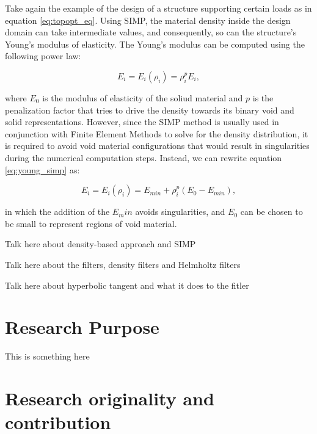 \documentclass[../main.tex]{subfiles}
\begin{document}
Take again the example of the design of a structure supporting certain loads as in equation \ref{eq:topopt_eq}. Using SIMP, the material density inside the design domain can take intermediate values, and consequently, so can the structure's Young's modulus of elasticity. The Young's modulus can be computed using the following power law:

\begin{equation}
  E_i = E_i(\rho_i) = \rho^p_i E_i,
  \label{eq:young_simp}
\end{equation}

where $E_0$ is the modulus of elasticity of the soliud material and $p$ is the penalization factor that tries to drive the density towards its binary void and solid representations. However, since the SIMP method is usually used in conjunction with Finite Element Methods to solve for the density distribution, it is required to avoid void material configurations that would result in singularities during the numerical computation steps. Instead, we can rewrite equation \ref{eq:young_simp} as:

\begin{equation}
  E_i = E_i(\rho_i) = E_{min} + \rho_i^p (E_0 - E_{min}),
\end{equation}

in which the addition of the $E_min$ avoids singularities, and $E_0$ can be chosen to be small to represent regions of void material.



Talk here about density-based approach and SIMP 

Talk here about the filters, density filters and Helmholtz filters

Talk here about hyperbolic tangent and what it does to the fitler


\section{Research Purpose}
 
This is something here

\section{Research originality and contribution}
\end{document}
